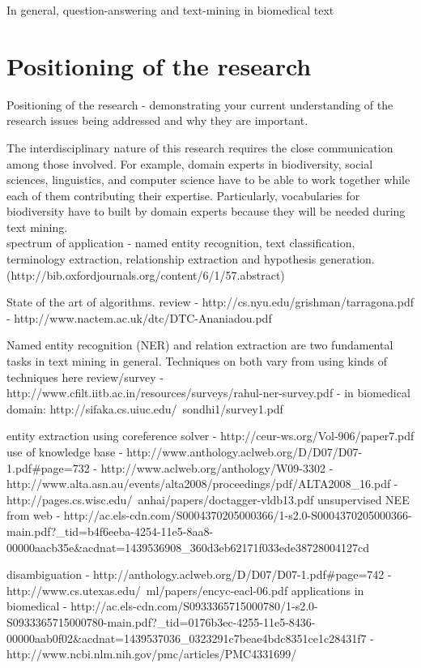 \documentclass[12pt]{article}
\begin{document}
In general, question-answering and text-mining in biomedical text

\section{Positioning of the research}
\label{ch:proposal}
Positioning of the research - demonstrating your current understanding of the research issues being addressed and why they are important.

The interdisciplinary nature of this research requires the close communication among those involved. For example, domain experts in biodiversity, social sciences, linguistics, and computer science have to be able to work together while each of them contributing their expertise. Particularly, vocabularies for biodiversity have to built by domain experts because they will be needed during text mining.\\

spectrum of application
- named entity recognition, text classification, terminology extraction, relationship extraction and hypothesis generation. (http://bib.oxfordjournals.org/content/6/1/57.abstract)

State of the art of algorithms. 
review
- http://cs.nyu.edu/grishman/tarragona.pdf
- http://www.nactem.ac.uk/dtc/DTC-Ananiadou.pdf

Named entity recognition (NER) and relation extraction are two fundamental tasks in text mining in general. Techniques on both vary from using kinds of techniques here
review/survey
- http://www.cfilt.iitb.ac.in/resources/surveys/rahul-ner-survey.pdf
- in biomedical domain: http://sifaka.cs.uiuc.edu/~sondhi1/survey1.pdf

entity extraction using coreference solver
- http://ceur-ws.org/Vol-906/paper7.pdf
use of knowledge base
- http://www.anthology.aclweb.org/D/D07/D07-1.pdf#page=732
- http://www.aclweb.org/anthology/W09-3302
- http://www.alta.asn.au/events/alta2008/proceedings/pdf/ALTA2008_16.pdf
- http://pages.cs.wisc.edu/~anhai/papers/doctagger-vldb13.pdf
unsupervised NEE from web
- http://ac.els-cdn.com/S0004370205000366/1-s2.0-S0004370205000366-main.pdf?_tid=b4f6eeba-4254-11e5-8aa8-00000aacb35e&acdnat=1439536908_360d3eb62171f033ede38728004127cd

disambiguation
- http://anthology.aclweb.org/D/D07/D07-1.pdf#page=742
- http://www.cs.utexas.edu/~ml/papers/encyc-eacl-06.pdf
applications in biomedical
- http://ac.els-cdn.com/S0933365715000780/1-s2.0-S0933365715000780-main.pdf?_tid=0176b3ec-4255-11e5-8436-00000aab0f02&acdnat=1439537036_0323291c7beae4bdc8351ce1c28431f7
- http://www.ncbi.nlm.nih.gov/pmc/articles/PMC4331699/
\end{document}
